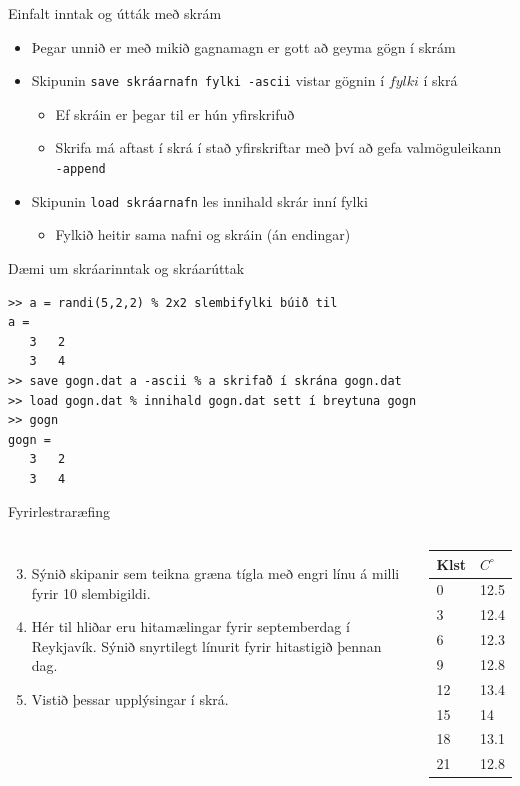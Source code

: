 \documentclass[handout]{beamer}
\begin{document}
\begin{frame}{Einfalt inntak og útták með skrám}
\begin{itemize}
 \item Þegar unnið er með mikið gagnamagn er gott að geyma gögn í skrám
 \item Skipunin \texttt{save skráarnafn fylki -ascii} vistar gögnin í $fylki$ í skrá
 \begin{itemize}
  \item Ef skráin er þegar til er hún yfirskrifuð
  \item Skrifa má aftast í skrá í stað yfirskriftar með því að gefa valmöguleikann \texttt{-append}
 \end{itemize}
 \item Skipunin \texttt{load skráarnafn} les innihald skrár inní fylki
  \begin{itemize}
   \item Fylkið heitir sama nafni og skráin (án endingar)
  \end{itemize}
 \end{itemize}
\end{frame}

\begin{frame}[fragile]{Dæmi um skráarinntak og skráarúttak}
\begin{verbatim}
>> a = randi(5,2,2) % 2x2 slembifylki búið til
a =
   3   2
   3   4
>> save gogn.dat a -ascii % a skrifað í skrána gogn.dat
>> load gogn.dat % innihald gogn.dat sett í breytuna gogn
>> gogn
gogn =
   3   2
   3   4
\end{verbatim}
\end{frame}

\begin{frame}{Fyrirlestraræfing}
\begin{columns}
\begin{enumerate}
\setcounter{enumi}{2}
 \item Sýnið skipanir sem teikna græna tígla með engri línu á milli fyrir 10 slembigildi.
 \item Hér til hliðar eru hitamælingar fyrir septemberdag í Reykjavík. Sýnið snyrtilegt línurit fyrir hitastigið þennan dag.
 \item Vistið þessar upplýsingar í skrá.
\end{enumerate}
\begin{center}
\begin{tabular}{ll}
\toprule
Klst&$C^\circ$\\
\midrule
0&12.5\\
3&12.4\\
6&12.3\\
9&12.8\\
12&13.4\\
15&14\\
18&13.1\\
21&12.8\\
\bottomrule
\end{tabular}
\end{center}
\end{columns}

\end{frame}
\end{document}
